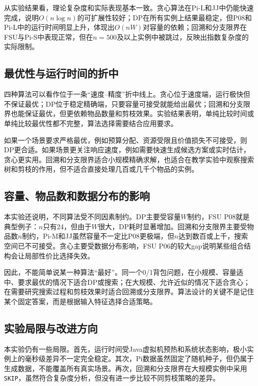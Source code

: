\documentclass[10.5pt,a4paper,fontset=none]{ctexart}
\begin{document}
从实验结果看，理论复杂度和实际表现基本一致。贪心算法在Pi-L和JJ中仍能快速完成，说明$O(n\log n)$的可扩展性较好；DP在所有实例上结果最稳定，但P08和Pi-L中的运行时间明显上升，体现出$O(nW)$对容量的依赖；回溯和分支限界在FSU与Pi-S中表现正常，但在$n=500$及以上实例中被跳过，反映出指数复杂度的实际限制。

\subsection{最优性与运行时间的折中}

四种算法可以看作位于一条“速度--精度”折中线上。贪心位于速度端，运行极快但不保证最优；DP位于稳定精确端，只要容量可接受就能给出最优；回溯和分支限界也能保证最优，但更依赖物品数量和剪枝效果。实验结果表明，单纯比较时间或单纯比较最优性都不完整，算法选择需要结合应用要求。

如果一个场景要求严格最优，例如预算分配、资源受限且价值损失不可接受，则DP更合适。如果场景更关注响应速度，例如需要快速生成候选方案或实时估计，贪心更实用。回溯和分支限界适合小规模精确求解，也适合在教学实验中观察搜索树和剪枝的作用，但不适合直接处理几百或几千个物品的实例。

\subsection{容量、物品数和数据分布的影响}

本实验还说明，不同算法受不同因素制约。DP主要受容量$W$制约，FSU P08就是典型例子：$n$只有24，但由于$W$很大，DP耗时显著增加。回溯和分支限界主要受物品数$n$制约，Pi-M和JJ虽然容量不一定比P08更极端，但$n$达到数百或上千，搜索空间已不可接受。贪心主要受数据分布影响，FSU P06的较大gap说明某些组合结构会让局部性价比选择失效。

因此，不能简单说某一种算法“最好”。同一个0/1背包问题，在小规模、容量适中、要求最优的情况下适合DP或搜索；在大规模、允许近似的情况下适合贪心；在需要研究搜索过程和剪枝效果时适合回溯或分支限界。算法设计的关键不是记住某个固定答案，而是根据输入特征选择合适策略。

\subsection{实验局限与改进方向}

本实验仍有一些局限。首先，运行时间受Java虚拟机预热和系统状态影响，极小实例上的毫秒级差异不一定完全稳定。其次，Pi数据虽然固定了随机种子，但仍属于生成数据，不能覆盖所有真实场景。再次，回溯和分支限界在大规模实例中采用\texttt{SKIP}，虽然符合复杂度分析，但没有进一步比较不同剪枝策略的差异。
\end{document}
